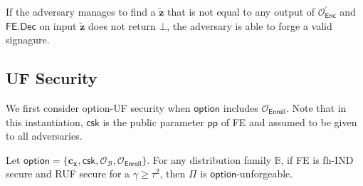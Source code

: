 If the adversary manages to find a $\mathbf{\tilde{z}}$ that is not equal to any output of $\mathcal{O}_\textsf{Enc}^\prime$ and $\textsf{FE.Dec}$ on input $\mathbf{\tilde{z}}$ does not return $\bot$, the adversary is able to forge a valid signagure.




\subsection{UF Security}
\label{sec:security_analysis:fh-IPFE:uf}

We first consider \textsf{option}-UF security when $\textsf{option}$ includes $\mathcal{O}_\textsf{Enroll}$. Note that in this instantiation, $\textsf{csk}$ is the public parameter $\textsf{pp}$ of \textsf{FE} and assumed to be given to all adversaries. 

\begin{theorem}
\label{thm:ind-uf-OB-Enroll}
	Let $\textsf{option} = \{ \mathbf{c_x}, \textsf{csk}, \mathcal{O}_\mathcal{B}, \mathcal{O}_{\textsf{Enroll}} \}$. For any distribution family $\mathbb{B}$, if \textsf{FE} is fh-IND secure and RUF secure for a $\gamma \geq \tau^2$, then $\Pi$ is $\textsf{option}$-unforgeable. 
\end{theorem}


